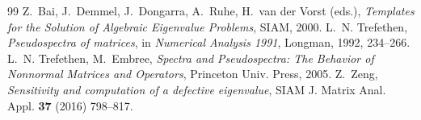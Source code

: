 \documentclass[11pt]{article}
\begin{document}
\begin{thebibliography}{99}
 Z.~Bai, J.~Demmel, J.~Dongarra, A.~Ruhe, H.~van der Vorst (eds.),
  \emph{Templates for the Solution of Algebraic Eigenvalue Problems}, SIAM, 2000.
 L.~N. Trefethen, \emph{Pseudospectra of matrices}, in \emph{Numerical Analysis
  1991}, Longman, 1992, 234--266.
 L.~N. Trefethen, M.~Embree, \emph{Spectra and Pseudospectra: The
  Behavior of Nonnormal Matrices and Operators}, Princeton Univ. Press, 2005.
 Z.~Zeng, \emph{Sensitivity and computation of a defective eigenvalue}, SIAM J.
  Matrix Anal. Appl. \textbf{37} (2016) 798--817.
\end{thebibliography}
\end{document}
